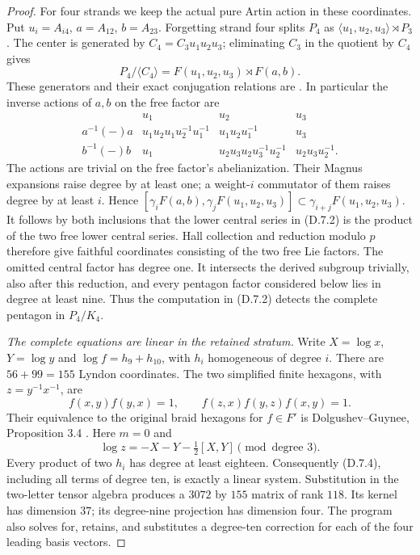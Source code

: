 \begin{proof}
For four strands we keep the actual pure Artin action in these
coordinates. Put $u_i=A_{i4}$, $a=A_{12}$, $b=A_{23}$.
Forgetting strand four splits $P_4$ as
$\langle u_1,u_2,u_3\rangle\rtimes P_3$.
The center is generated by
$C_4=C_3u_1u_2u_3$; eliminating $C_3$ in the quotient by
$C_4$ gives
\[
 P_4/\langle C_4\rangle
       =F(u_1,u_2,u_3)\rtimes F(a,b).
 \tag{D.7.2}
\]
These generators and their exact conjugation relations are
\cite[(2.1)--(2.3)]{DE_CohenFalkRandell2012}.
In particular the inverse actions of $a,b$ on the free factor are
\[
\begin{array}{c|ccc}
 &u_1&u_2&u_3\\\hline
 a^{-1}(-)a&u_1u_2u_1u_2^{-1}u_1^{-1}
                  &u_1u_2u_1^{-1}&u_3\\
 b^{-1}(-)b&u_1&u_2u_3u_2u_3^{-1}u_2^{-1}
                  &u_2u_3u_2^{-1}.
\end{array}
\tag{D.7.3}
\]
The actions are trivial on the free factor's abelianization.
Their Magnus expansions raise degree by at least one; a weight-$i$
commutator of them raises degree by at least $i$. Hence
$[\gamma_iF(a,b),\gamma_jF(u_1,u_2,u_3)]
\subset\gamma_{i+j}F(u_1,u_2,u_3)$.
It follows by both inclusions that the lower central series in
(D.7.2) is the product of the two free lower central series.
Hall collection and reduction modulo $p$ therefore give faithful
coordinates consisting of the two free Lie factors. The omitted
central factor has degree one. It intersects the derived subgroup
trivially, also after this reduction, and every pentagon factor
considered below lies in degree at least nine. Thus the computation
in (D.7.2) detects the complete pentagon in $P_4/K_4$.

\emph{The complete equations are linear in the retained stratum.}
Write $X=\log x$, $Y=\log y$ and
$\log f=h_9+h_{10}$, with $h_i$ homogeneous of degree $i$.
There are $56+99=155$ Lyndon coordinates.
The two simplified finite hexagons, with $z=y^{-1}x^{-1}$, are
\[
 f(x,y)f(y,x)=1,\qquad
 f(z,x)f(y,z)f(x,y)=1.
 \tag{D.7.4}
\]
Their equivalence to the original braid hexagons for $f\in F'$
is Dolgushev--Guynee, Proposition 3.4
\cite{DE_DolgushevGuynee2024}. Here $m=0$ and
\[
 \log z=-X-Y-\tfrac12[X,Y]\pmod{\text{degree }3}.
\]
Every product of two $h_i$ has degree at least eighteen.
Consequently (D.7.4), including all terms of degree ten, is
exactly a linear system. Substitution in the two-letter tensor
algebra produces a $3072$ by $155$ matrix of rank $118$.
Its kernel has dimension $37$; its degree-nine projection has
dimension four. The program also solves for, retains, and
substitutes a degree-ten correction for each of the four leading
basis vectors.


\end{proof}
